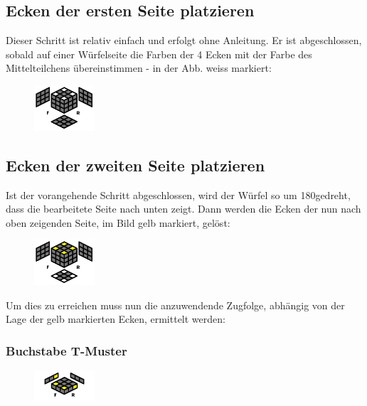 \documentclass[letterpaper,10pt,twoside,twocolumn,openany]{book}
\begin{document}
\subsection{Ecken der ersten Seite platzieren}
\begin{justify}
Dieser Schritt ist relativ einfach und erfolgt ohne Anleitung. Er ist abgeschlossen, sobald auf einer Würfelseite die Farben der 4 Ecken mit der Farbe des Mittelteilchens übereinstimmen - in der Abb. weiss markiert:
\end{justify}

\begin{figure}[!htb] 
  \centering
     \includegraphics[width=0.20\textwidth]{img/white_corners.png}
\end{figure}

\newpage
\subsection{Ecken der zweiten Seite platzieren}
\begin{justify}
Ist der vorangehende Schritt abgeschlossen, wird der Würfel so um 180\degree gedreht, dass die bearbeitete Seite nach unten zeigt. Dann werden die Ecken der nun nach oben zeigenden Seite, im Bild gelb markiert, gelöst:
\end{justify}

\begin{figure}[!htb] 
  \centering
     \includegraphics[width=0.20\textwidth]{img/yellow_corners.png}
\end{figure}
\begin{justify}
Um dies zu erreichen muss nun die anzuwendende Zugfolge, abhängig von der Lage der gelb markierten Ecken, ermittelt werden:
\end{justify}

\subsubsection{Buchstabe T-Muster}
\begin{figure}[!htb] 
  \centering
     \includegraphics[width=0.20\textwidth]{img/t_pattern.png}
\end{figure}
\end{document}
